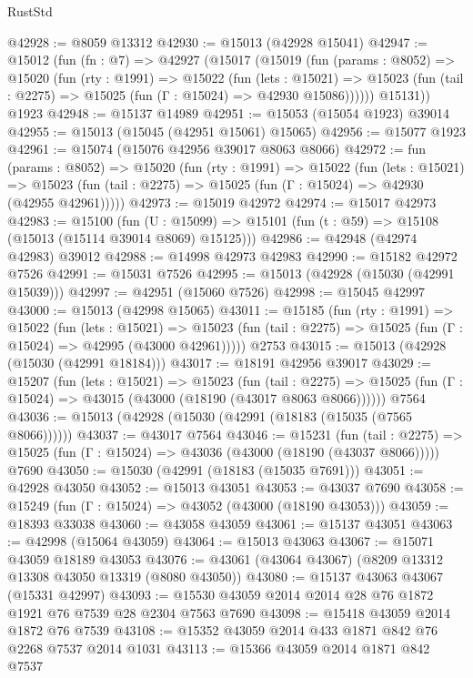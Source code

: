 \begin{lexlean}{RustStd}
\begin{coremodule}
@42928 := @8059 @13312
@42930 := @15013 (@42928 @15041)
@42947 := @15012
    (fun (fn : @7) =>
    @42927
      (@15017
        (@15019
          (fun (params : @8052) =>
          @15020
            (fun (rty : @1991) =>
            @15022
              (fun (lets : @15021) =>
              @15023 (fun (tail : @2275) => @15025 (fun (Γ : @15024) => @42930 @15086))))))
        @15131))
    @1923
@42948 := @15137 @14989
@42951 := @15053 (@15054 @1923) @39014
@42955 := @15013 (@15045 (@42951 @15061) @15065)
@42956 := @15077 @1923
@42961 := @15074 (@15076 @42956 @39017 @8063 @8066)
@42972 := fun (params : @8052) =>
  @15020
    (fun (rty : @1991) =>
    @15022
      (fun (lets : @15021) =>
      @15023 (fun (tail : @2275) => @15025 (fun (Γ : @15024) => @42930 (@42955 @42961)))))
@42973 := @15019 @42972
@42974 := @15017 @42973
@42983 := @15100
    (fun (U : @15099) => @15101 (fun (t : @59) => @15108 (@15013 (@15114 @39014 @8069) @15125)))
@42986 := @42948 (@42974 @42983) @39012
@42988 := @14998 @42973 @42983
@42990 := @15182 @42972 @7526
@42991 := @15031 @7526
@42995 := @15013 (@42928 (@15030 (@42991 @15039)))
@42997 := @42951 (@15060 @7526)
@42998 := @15045 @42997
@43000 := @15013 (@42998 @15065)
@43011 := @15185
    (fun (rty : @1991) =>
    @15022
      (fun (lets : @15021) =>
      @15023 (fun (tail : @2275) => @15025 (fun (Γ : @15024) => @42995 (@43000 @42961)))))
    @2753
@43015 := @15013 (@42928 (@15030 (@42991 @18184)))
@43017 := @18191 @42956 @39017
@43029 := @15207
    (fun (lets : @15021) =>
    @15023
      (fun (tail : @2275) =>
      @15025 (fun (Γ : @15024) => @43015 (@43000 (@18190 (@43017 @8063 @8066))))))
    @7564
@43036 := @15013 (@42928 (@15030 (@42991 (@18183 (@15035 (@7565 @8066))))))
@43037 := @43017 @7564
@43046 := @15231
    (fun (tail : @2275) => @15025 (fun (Γ : @15024) => @43036 (@43000 (@18190 (@43037 @8066)))))
    @7690
@43050 := @15030 (@42991 (@18183 (@15035 @7691)))
@43051 := @42928 @43050
@43052 := @15013 @43051
@43053 := @43037 @7690
@43058 := @15249 (fun (Γ : @15024) => @43052 (@43000 (@18190 @43053)))
@43059 := @18393 @33038
@43060 := @43058 @43059
@43061 := @15137 @43051
@43063 := @42998 (@15064 @43059)
@43064 := @15013 @43063
@43067 := @15071 @43059 @18189 @43053
@43076 := @43061 (@43064 @43067) (@8209 @13312 @13308 @43050 @13319 (@8080 @43050))
@43080 := @15137 @43063 @43067 (@15331 @42997)
@43093 := @15530 @43059 @2014 @2014 @28 @76 @1872 @1921 @76 @7539 @28 @2304 @7563 @7690
@43098 := @15418 @43059 @2014 @1872 @76 @7539
@43108 := @15352 @43059 @2014 @433 @1871 @842 @76 @2268 @7537 @2014 @1031
@43113 := @15366 @43059 @2014 @1871 @842 @7537

\end{coremodule}
\end{lexlean}
